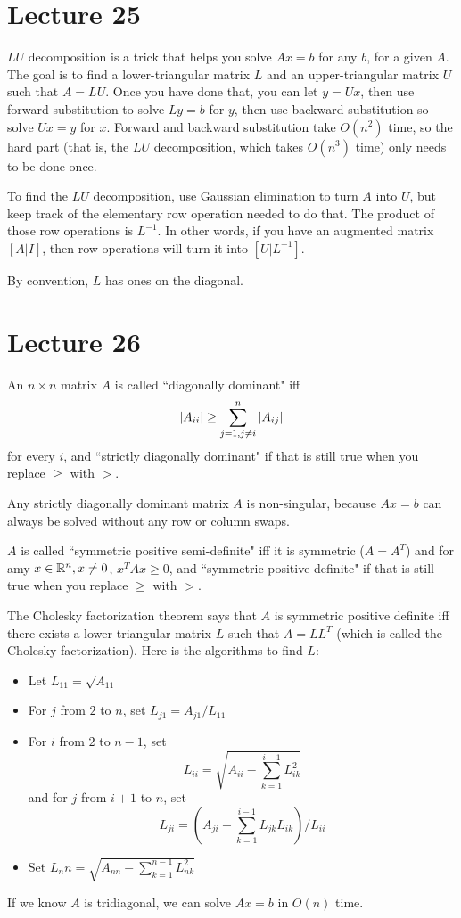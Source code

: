 \documentclass{article}
\begin{document}
\section{Lecture 25}
$LU$ decomposition is a trick that helps you solve $Ax=b$ for any $b$, for a given $A$. The goal is to find a lower-triangular matrix $L$ and an upper-triangular matrix $U$ such that $A=LU$. Once you have done that, you can let $y=Ux$, then use forward substitution to solve $Ly=b$ for $y$, then use backward substitution so solve $Ux=y$ for $x$. Forward and backward substitution take $O(n^2)$ time, so the hard part (that is, the $LU$ decomposition, which takes $O(n^3)$ time) only needs to be done once.
\par
To find the $LU$ decomposition, use Gaussian elimination to turn $A$ into $U$, but keep track of the elementary row operation needed to do that. The product of those row operations is $L^{-1}$. In other words, if you have an augmented matrix $[A|I]$, then row operations will turn it into $[U|L^{-1}]$.
\par
By convention, $L$ has ones on the diagonal.

\section{Lecture 26}
An $n \times n$ matrix $A$ is called ``diagonally dominant" iff
\[ \left\lvert A_{ii} \right\rvert \geq \sum_{j=1,j\neq i}^n \left\lvert A_{ij} \right\rvert \]
for every $i$, and ``strictly diagonally dominant" if that is still true when you replace $\geq$ with $>$.
\par
Any strictly diagonally dominant matrix $A$ is non-singular, because $Ax=b$ can always be solved without any row or column swaps.
\par
$A$ is called ``symmetric positive semi-definite" iff it is symmetric ($A=A^T$) and for amy $x \in \mathbb{R}^n, x \neq 0$, $x^T A x \geq 0$, and ``symmetric positive definite" if that is still true when you replace $\geq$ with $>$.
\par
The Cholesky factorization theorem says that $A$ is symmetric positive definite iff there exists a lower triangular matrix $L$ such that $A=LL^T$ (which is called the Cholesky factorization). Here is the algorithms to find $L$:
\begin{itemize}
    \item Let $L_{11}= \sqrt{A_{11}}$
    \item For $j$ from $2$ to $n$, set $L_{j1}=A_{j1}/L_{11}$
    \item For $i$ from $2$ to $n-1$, set
        \[ L_{ii}= \sqrt{ A_{ii}-\sum_{k=1}^{i-1} L_{ik}^2 } \]
        and for $j$ from $i+1$ to $n$, set
        \[ L_{ji} = \left( A_{ji}-\sum_{k=1}^{i-1} L_{jk}L_{ik} \right) / L_{ii} \]
    \item Set $L_nn = \sqrt{A_{nn} - \sum_{k=1}^{n-1} L_{nk}^2}$
\end{itemize}
If we know $A$ is tridiagonal, we can solve $Ax=b$ in $O(n)$ time.
\end{document}
